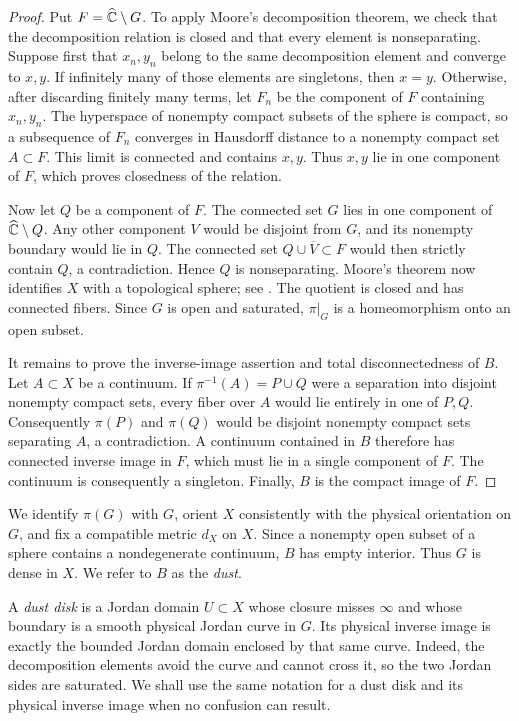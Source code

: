 \begin{proof}
Put $F=\widehat{\mathbb C}\setminus G$.  To apply Moore's decomposition theorem,
we check that the decomposition relation is closed and that every
element is nonseparating.  Suppose first that $x_n,y_n$ belong to the
same decomposition element and converge to $x,y$.  If infinitely many
of those elements are singletons, then $x=y$.  Otherwise, after
discarding finitely many terms, let $F_n$ be the component of $F$
containing $x_n,y_n$.  The hyperspace of nonempty compact subsets of
the sphere is compact, so a subsequence of $F_n$ converges in Hausdorff
distance to a nonempty compact set $A\subset F$.  This limit is
connected and contains $x,y$.  Thus $x,y$ lie in one component of $F$,
which proves closedness of the relation.

Now let $Q$ be a component of $F$.  The connected set $G$ lies in one
component of $\widehat{\mathbb C}\setminus Q$.  Any other component $V$ would be
disjoint from $G$, and its nonempty boundary
would lie in $Q$.  The connected set $Q\cup\overline V\subset F$
would then strictly contain $Q$, a contradiction.  Hence $Q$ is
nonseparating.  Moore's theorem now identifies $X$ with a topological
sphere; see \cite{Moore1925}.  The quotient is closed and has connected
fibers.  Since $G$ is open and saturated, $\pi|_G$ is a homeomorphism
onto an open subset.

It remains to prove the inverse-image assertion and total
disconnectedness of $B$.  Let $A\subset X$ be a continuum.  If
$\pi^{-1}(A)=P\cup Q$ were a separation into disjoint nonempty compact
sets, every fiber over $A$ would lie entirely in one of $P,Q$.
Consequently $\pi(P)$ and $\pi(Q)$ would be disjoint nonempty compact
sets separating $A$, a contradiction.  A continuum contained in $B$
therefore has connected inverse image in $F$, which must lie in a
single component of $F$.
The continuum is consequently a singleton.  Finally, $B$ is the compact
image of $F$.
\end{proof}

We identify $\pi(G)$ with $G$, orient $X$ consistently with the
physical orientation on $G$, and fix a compatible metric $d_X$ on $X$.
Since a nonempty open subset of a sphere contains a nondegenerate
continuum, $B$ has empty interior.  Thus $G$ is dense in $X$.  We refer
to $B$ as the \emph{dust}.

A \emph{dust disk} is a Jordan domain $U\subset X$ whose closure
misses $\infty$ and whose boundary is a smooth physical Jordan curve
in $G$.  Its physical inverse image is exactly the bounded Jordan
domain enclosed by that same curve.  Indeed, the decomposition
elements avoid the curve and cannot cross it, so the two Jordan sides
are saturated.  We shall use the same notation for a dust disk and its
physical inverse image when no confusion can result.

